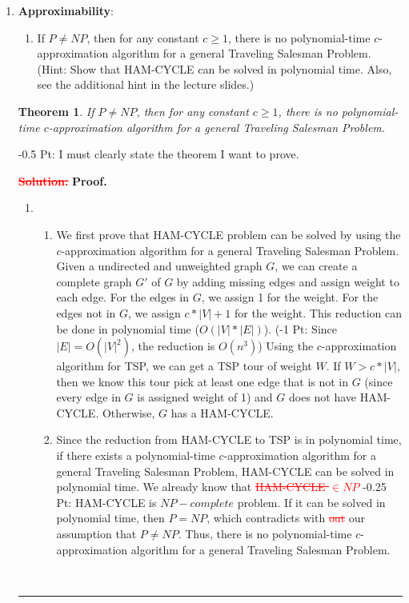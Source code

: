 \documentclass{article}%
\newtheorem{theorem}{Theorem}
\newenvironment{proof}[1][Proof]{\textbf{#1.} }{\ \rule{0.5em}{0.5em}}
\newcommand{\add}[1]{\textcolor{dkgreen}{#1}}
\newcommand{\rmv}[1]{\textcolor{red}{\sout{#1}}}
\begin{document}
\begin{enumerate}

	\item \textbf{Approximability}: 
	\begin{enumerate}
	\item  If $P \neq NP$, then for any constant $c \geq 1$, there is no polynomial-time $c$-approximation algorithm for a general Traveling Salesman Problem. (Hint: Show that HAM-CYCLE can be solved in polynomial time. Also, see the additional hint in the lecture slides.)
	
		\end{enumerate}
		
		\add{
		\begin{theorem}
		If $P \neq NP$, then for any constant $c \geq 1$, there is no polynomial-time $c$-approximation algorithm for a general Traveling Salesman Problem.
		\end{theorem}	
		-0.5 Pt: I must clearly state the theorem I want to prove.	
		}		
		
		\rmv{
		\textbf{Solution:}
		}	
		\begin{proof}
\begin{enumerate}
	\item 
\begin{enumerate}
	\item We first prove that HAM-CYCLE problem can be solved by using the $c$-approximation algorithm for a general Traveling Salesman Problem. Given a undirected and unweighted graph $G$, we can create a complete graph $G'$ of $G$ by adding missing edges and assign weight to each edge. For the edges in $G$, we assign 1 for the weight. For the edges not in $G$, we assign $c*|V| + 1$ for the weight. This reduction can be done in polynomial time ($O(|V|*|E|)$). \add{(-1 Pt: Since $|E|=O(|V|^2)$, the reduction is $O(n^3)$)} Using the $c$-approximation algorithm for TSP, we can get a TSP tour of weight $W$. If $W > c*|V|$, then we know this tour pick at least one edge that is not in $G$ (since every edge in $G$ is assigned weight of 1) and $G$ does not have HAM-CYCLE. Otherwise, $G$ has a HAM-CYCLE.
  \item  Since the reduction from HAM-CYCLE to TSP is in polynomial time, if there exists a polynomial-time $c$-approximation algorithm for a general Traveling Salesman Problem, HAM-CYCLE can be solved in polynomial time. We already know that \rmv{HAM-CYCLE $\in NP$} \add{-0.25 Pt: HAM-CYCLE is $NP-complete$ problem}. If it can be solved in polynomial time, then $P=NP$, which contradicts with \rmv{out} \add{our} assumption that $P \neq NP$. Thus, there is no polynomial-time $c$-approximation algorithm for a general Traveling Salesman Problem. 
\end{enumerate}
\end{enumerate}
		\end{proof}
		
		\end{enumerate}
\end{document}
